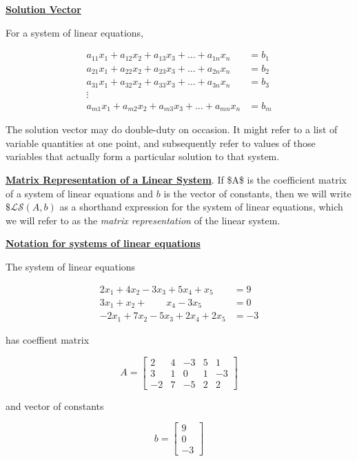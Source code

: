 \documentclass[openany]{book}
\begin{document}
\protect\hyperlink{definition-solv-solution-vector}{\textbf{Solution
Vector}}

For a system of linear equations,

\[\begin{aligned}
a_{11}x_1+a_{12}x_2+a_{13}x_3+\dots+a_{1n}x_n&=b_1\\
a_{21}x_1+a_{22}x_2+a_{23}x_3+\dots+a_{2n}x_n&=b_2\\
a_{31}x_1+a_{32}x_2+a_{33}x_3+\dots+a_{3n}x_n&=b_3\\
\vdots&\\
a_{m1}x_1+a_{m2}x_2+a_{m3}x_3+\dots+a_{mn}x_n&=b_m
\end{aligned}\]

The solution vector may do double-duty on occasion. It might refer to a
list of variable quantities at one point, and subsequently refer to
values of those variables that actually form a particular solution to
that system.

\protect\hyperlink{definition-mrls-matrix-representation-of-a-linear-system}{\textbf{Matrix
Representation of a Linear System}}. If \$A\$ is the coefficient matrix
of a system of linear equations and \({b}\) is the vector of constants,
then we will write \(\$\mathcal L \mathcal S({A}, b)\) as a shorthand
expression for the system of linear equations, which we will refer to as
the \emph{matrix representation} of the linear system.

\protect\hyperlink{example-nsle-notation-for-systems-of-linear-equations}{\textbf{Notation
for systems of linear equations}}

The system of linear equations

\[\begin{aligned}
2x_1+4x_2-3x_3+5x_4+x_5&=9\\
3x_1+x_2+\quad\quad x_4-3x_5&=0\\
-2x_1+7x_2-5x_3+2x_4+2x_5&=-3
\end{aligned}\]

has coeffient matrix

\[
A=
\begin{bmatrix}
2 & 4 & -3 & 5 & 1\\
3 & 1 & 0 & 1 & -3\\
-2 & 7 & -5 & 2 & 2
\end{bmatrix}
\]

and vector of constants

\[
{b}=\begin{bmatrix}
9\\
0\\
-3
\end{bmatrix}
\]
\end{document}
